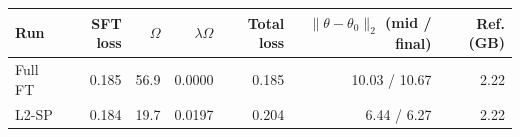 \begin{tabular}{lrrrrrr}
\toprule
Run & SFT loss & $\Omega$ & $\lambda\Omega$ & Total loss & $\|\theta-\theta_0\|_2$ (mid / final) & Ref. (GB) \\
\midrule
Full FT & 0.185 & 56.9 & 0.0000 & 0.185 & 10.03 / 10.67 & 2.22 \\
L2-SP & 0.184 & 19.7 & 0.0197 & 0.204 & 6.44 / 6.27 & 2.22 \\
\bottomrule
\end{tabular}
